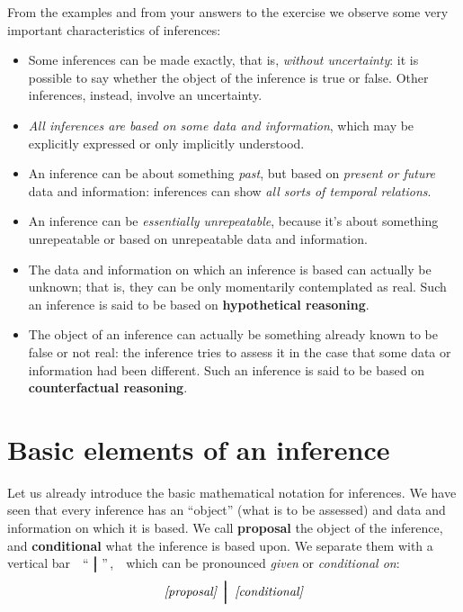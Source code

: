 \documentclass[
  a4paper,
  DIV=11,
  numbers=noendperiod,
  oneside]{scrreprt}
\begin{document}
From the examples and from your answers to the exercise we observe some
very important characteristics of inferences:

\begin{itemize}
\item
  Some inferences can be made exactly, that is, {\emph{without
  uncertainty}}: it is possible to say whether the object of the
  inference is true or false. Other inferences, instead, involve an
  uncertainty.
\item
  {\emph{All inferences are based on some data and information}}, which
  may be explicitly expressed or only implicitly understood.
\item
  An inference can be about something \emph{past}, but based on
  \emph{present or future} data and information: inferences can show
  {\emph{all sorts of temporal relations}}.
\item
  An inference can be {\emph{essentially unrepeatable}}, because it's
  about something unrepeatable or based on unrepeatable data and
  information.
\item
  The data and information on which an inference is based can actually
  be unknown; that is, they can be only momentarily contemplated as
  real. Such an inference is said to be based on {\textbf{hypothetical
  reasoning}}.
\item
  The object of an inference can actually be something already known to
  be false or not real: the inference tries to assess it in the case
  that some data or information had been different. Such an inference is
  said to be based on {\textbf{counterfactual reasoning}}.
\end{itemize}

\hypertarget{basic-elements-of-an-inference}{%
\section{Basic elements of an
inference}\label{basic-elements-of-an-inference}}

Let us already introduce the basic mathematical notation for inferences.
We have seen that every inference has an ``object'' (what is to be
assessed) and data and information on which it is based. We call
{\textbf{proposal}} the object of the inference, and
{\textbf{conditional}} what the inference is based upon. We separate
them with a vertical
bar~~{``\,\(\pmb{\nonscript\:\big\vert\nonscript\:\mathopen{}}\)''\,,}~~which
can be pronounced \emph{given} or \emph{conditional on}: \[
\textit{[proposal]}\ \pmb{\nonscript\:\Big\vert\nonscript\:\mathopen{}}\ 
\textit{[conditional]}
\]
\end{document}
